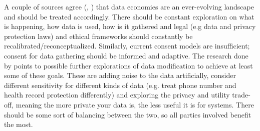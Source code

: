 \documentclass[a4paper,11pt]{report} %
\theoremstyle{change}
\theoremstyle{theoremstyle}
\begin{document}
A couple of sources agree (\cite{valli2024ethical}, \cite{mirishli2025ethical}) that data economies are an ever-evolving landscape and should be treated accordingly. There should be constant exploration on what is happening, how data is used, how is it gathered and legal (e.g data and privacy protection laws) and ethical frameworks should constantly be recalibrated/reconceptualized. Similarly, current consent models are insufficient; consent for data gathering should be informed and adaptive. The research done by \cite{valli2024ethical} points to possible further explorations of data modification to achieve at least some of these goals. These are adding noise to the data artificially, consider different sensitivity for different kinds of data (e.g. treat phone number and health record protection differently) and exploring the privacy and utility trade-off, meaning the more private your data is, the less useful it is for systems. There should be some sort of balancing between the two, so all parties involved benefit the most.\\
\end{document}
